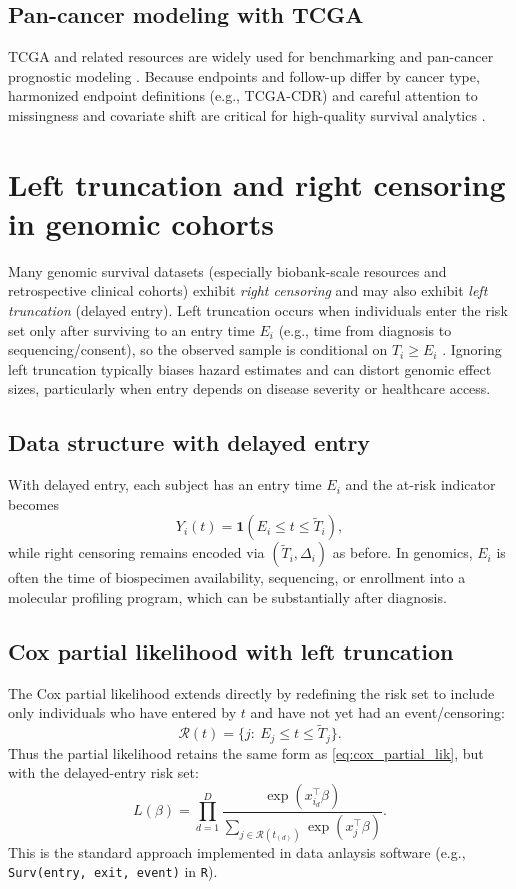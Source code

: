 \documentclass[11pt]{article}
\begin{document}
\subsection{Pan-cancer modeling with TCGA}
TCGA and related resources are widely used for benchmarking and pan-cancer prognostic modeling \citep{Weinstein2013,Tomczak2015}. Because endpoints and follow-up differ by cancer type, harmonized endpoint definitions (e.g., TCGA-CDR) and careful attention to missingness and covariate shift are critical for high-quality survival analytics \citep{Liu2018}.

\section{Left truncation and right censoring in genomic cohorts}
Many genomic survival datasets (especially biobank-scale resources and retrospective clinical cohorts) exhibit \emph{right censoring} and may also exhibit \emph{left truncation} (delayed entry). Left truncation occurs when individuals enter the risk set only after surviving to an entry time $E_i$ (e.g., time from diagnosis to sequencing/consent), so the observed sample is conditional on $T_i \ge E_i$ \citep{KleinMoeschberger2003}. Ignoring left truncation typically biases hazard estimates and can distort genomic effect sizes, particularly when entry depends on disease severity or healthcare access.

\subsection{Data structure with delayed entry}\label{sec:delay-entry}
With delayed entry, each subject has an entry time $E_i$ and the at-risk indicator becomes
\begin{equation}
Y_i(t)=\mathbf{1}(E_i \le t \le \tilde T_i),
\label{eq:delayed_entry_Y}
\end{equation}
while right censoring remains encoded via $(\tilde T_i,\Delta_i)$ as before. In genomics, $E_i$ is often the time of biospecimen availability, sequencing, or enrollment into a molecular profiling program, which can be substantially after diagnosis.

\subsection{Cox partial likelihood with left truncation}\label{sec:cox-model-left-truncation}
The Cox partial likelihood extends directly by redefining the risk set to include only individuals who have entered by $t$ and have not yet had an event/censoring:
\[
\mathcal{R}(t)=\{j:\ E_j \le t \le \tilde T_j\}.
\]
Thus the partial likelihood retains the same form as \eqref{eq:cox_partial_lik}, but with the delayed-entry risk set:
\begin{equation}
L(\beta)=\prod_{d=1}^{D}\frac{\exp(x_{i_d}^\top\beta)}{\sum_{j\in \mathcal{R}(t_{(d)})}\exp(x_j^\top\beta)}.
\label{eq:cox_partial_lik_left_trunc}
\end{equation}
This is the standard approach implemented in data anlaysis software (e.g., \texttt{Surv(entry, exit, event)} in \texttt{R}).
\end{document}
